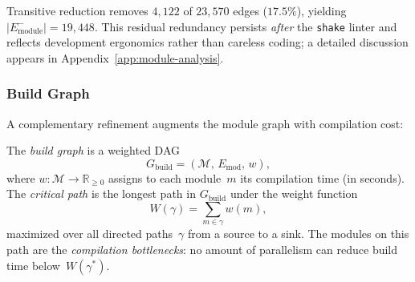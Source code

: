 Transitive reduction removes $4{,}122$ of $23{,}570$ edges ($17.5\%$), yielding $|E_{\mathrm{module}}^{-}| = 19{,}448$. This residual redundancy persists \emph{after} the \texttt{shake} linter and reflects development ergonomics rather than careless coding; a detailed discussion appears in Appendix~\ref{app:module-analysis}.

\subsubsection{Build Graph}

A complementary refinement augments the module graph with compilation cost:

\begin{definition}\label{def:build-graph}
The \emph{build graph} is a weighted DAG
\[
  G_{\mathrm{build}} = (\mathcal{M},\, E_{\mathrm{mod}},\, w),
\]
where $w : \mathcal{M} \to \mathbb{R}_{\ge 0}$ assigns to each module~$m$ its compilation time (in seconds). The \emph{critical path} is the longest path in $G_{\mathrm{build}}$ under the weight function
\[
  W(\gamma) = \sum_{m \in \gamma} w(m),
\]
maximized over all directed paths~$\gamma$ from a source to a sink. The modules on this path are the \emph{compilation bottlenecks}: no amount of parallelism can reduce build time below~$W(\gamma^*)$.
\end{definition}

